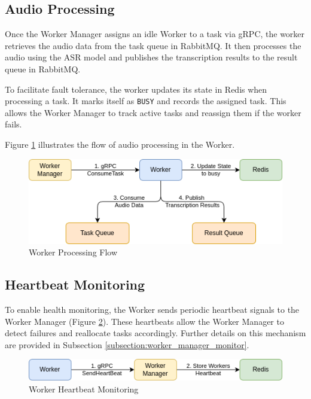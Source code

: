 \subsection{Audio Processing}
Once the Worker Manager assigns an idle Worker to a task via gRPC, the worker retrieves the audio data from the task queue in RabbitMQ. It then processes the audio using the ASR model and publishes the transcription results to the result queue in RabbitMQ.  

To facilitate fault tolerance, the worker updates its state in Redis when processing a task. It marks itself as \texttt{BUSY} and records the assigned task. This allows the Worker Manager to track active tasks and reassign them if the worker fails.

Figure \ref{fig:worker_processing} illustrates the flow of audio processing in the Worker.
\begin{figure}[ht]
  \centering
  \includegraphics[width=.8\textwidth]{figures/worker_processing.drawio.png}
  \caption{Worker Processing Flow}
  \label{fig:worker_processing}
\end{figure}

\subsection{Heartbeat Monitoring}
To enable health monitoring, the Worker sends periodic heartbeat signals to the Worker Manager (Figure \ref{fig:worker_heartbeat}). These heartbeats allow the Worker Manager to detect failures and reallocate tasks accordingly. Further details on this mechanism are provided in Subsection \ref{subsection:worker_manager_monitor}.

\begin{figure}[ht]
  \centering
  \includegraphics[width=.8\textwidth]{figures/worker_heartbeat.drawio.png}
  \caption{Worker Heartbeat Monitoring}
  \label{fig:worker_heartbeat}
\end{figure}

